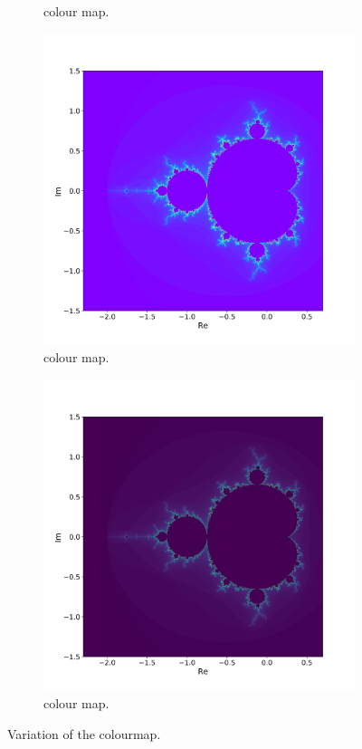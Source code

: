 \documentclass[
  12pt,					%
  a4paper,				%
  twoside,				%
]{report}
\begin{document}
\begin{figure}[H]
\begin{subfigure}{.45\textwidth}
  \caption{{} colour map.}
\end{subfigure}
\begin{subfigure}{.45\textwidth}
  \centering
  \includegraphics[width=\linewidth]{IMG/ColourInRainbow.png}
  \caption{{} colour map.}
\end{subfigure}
\begin{subfigure}{.45\textwidth}
  \centering
  \includegraphics[width=\linewidth]{IMG/ColourViridis.png}
  \caption{{} colour map.}
\end{subfigure}
\caption{Variation of the colourmap.}
\label{FIG_Colourmap}
\end{figure}
\end{document}
